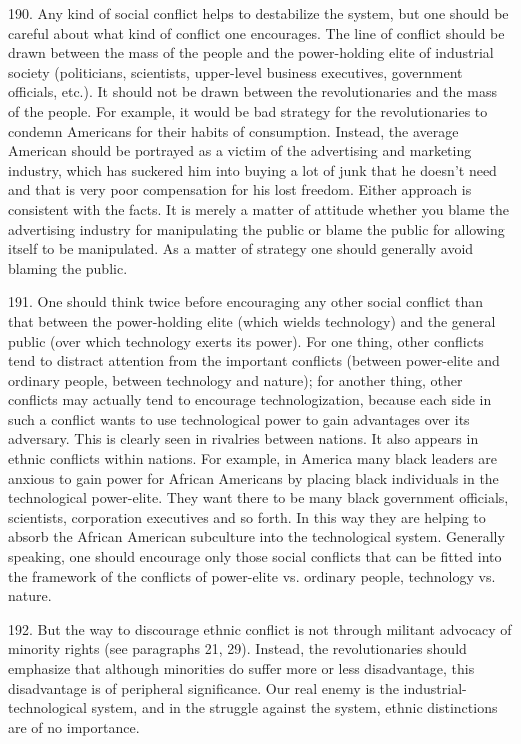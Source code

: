 \documentclass{article}
\begin{document}
190. Any kind of social conflict helps to destabilize the system, but one should be careful about 
what kind of conflict one encourages. The line of conflict should be drawn between the mass of 
the people and the power-holding elite of industrial society (politicians, scientists, upper-level 
business executives, government officials, etc.). It should not be drawn between the 
revolutionaries and the mass of the people. For example, it would be bad strategy for the 
revolutionaries to condemn Americans for their habits of consumption. Instead, the average 
American should be portrayed as a victim of the advertising and marketing industry, which has 
suckered him into buying a lot of junk that he doesn’t need and that is very poor compensation for 
his lost freedom. Either approach is consistent with the facts. It is merely a matter of attitude 
whether you blame the advertising industry for manipulating the public or blame the public for 
allowing itself to be manipulated. As a matter of strategy one should generally avoid blaming the 
public. \vspace{\baselineskip}

191. One should think twice before encouraging any other social conflict than that between the 
power-holding elite (which wields technology) and the general public (over which technology 
exerts its power). For one thing, other conflicts tend to distract attention from the important 
conflicts (between power-elite and ordinary people, between technology and nature); for another 
thing, other conflicts may actually tend to encourage technologization, because each side in such 
a conflict wants to use technological power to gain advantages over its adversary. This is clearly 
seen in rivalries between nations. It also appears in ethnic conflicts within nations. For example, 
in America many black leaders are anxious to gain power for African Americans by placing black 
individuals in the technological power-elite. They want there to be many black government 
officials, scientists, corporation executives and so forth. In this way they are helping to absorb the 
African American subculture into the technological system. Generally speaking, one should 
encourage only those social conflicts that can be fitted into the framework of the conflicts of 
power-elite vs. ordinary people, technology vs. nature. \vspace{\baselineskip}

192. But the way to discourage ethnic conflict is not through militant advocacy of minority rights 
(see paragraphs 21, 29). Instead, the revolutionaries should emphasize that although minorities do 
suffer more or less disadvantage, this disadvantage is of peripheral significance. Our real enemy 
is the industrial-technological system, and in the struggle against the system, ethnic distinctions 
are of no importance. \vspace{\baselineskip}
\end{document}
